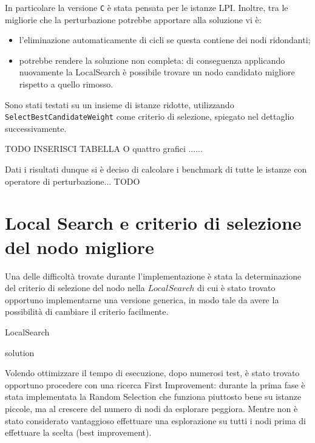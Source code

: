 \documentclass[11pt]{article}
\begin{document}
In particolare la versione \texttt{C} è stata pensata per le istanze LPI. Inoltre, tra le migliorie che la perturbazione potrebbe apportare alla soluzione vi è:
\begin{itemize}
\item{l'eliminazione automaticamente di cicli se questa contiene dei nodi ridondanti;}
\item{potrebbe rendere la soluzione non completa: di conseguenza applicando nuovamente la LocalSearch è possibile trovare un nodo candidato migliore rispetto a quello rimosso.}
\end{itemize}

Sono stati testati su un insieme di istanze ridotte, utilizzando \verb|SelectBestCandidateWeight| come criterio di selezione, spiegato nel dettaglio successivamente.

\begin{center}
    TODO INSERISCI TABELLA O quattro grafici ......
\end{center}

Dati i risultati dunque si è deciso di calcolare i benchmark di tutte le istanze con operatore di perturbazione... TODO

\pagebreak

\section{Local Search e criterio di selezione del nodo migliore}

Una delle difficoltà trovate durante l'implementazione è stata la determinazione del criterio di selezione del nodo nella $LocalSearch$ di cui è stato trovato opportuno implementarne una versione generica, in modo tale da avere la possibilità di cambiare il criterio facilmente.

\begin{algorithm}
\caption{LocalSearch}
\begin{algorithmic}

\EndWhile
\State \Return solution
\end{algorithmic}
\end{algorithm}

Volendo ottimizzare il tempo di esecuzione, dopo numerosi test, è stato trovato opportuno procedere con una ricerca First Improvement: durante la prima fase è stata implementata la Random Selection che funziona piuttosto bene su istanze piccole, ma al crescere del numero di nodi da esplorare peggiora. Mentre non è stato considerato vantaggioso effettuare una esplorazione su tutti i nodi prima di effettuare la scelta (best improvement).
\end{document}
